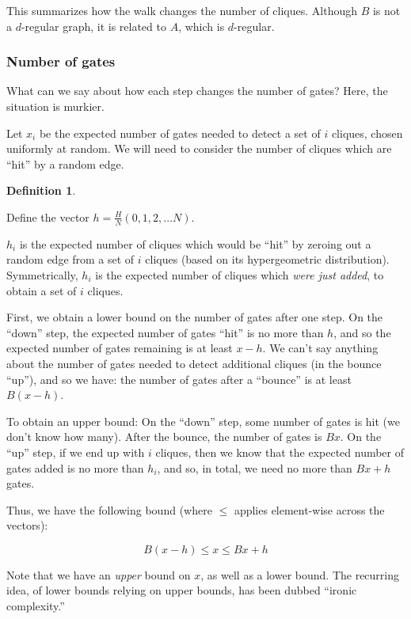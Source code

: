 \documentclass[12pt]{article}
\theoremstyle{definition}
\newtheorem{defn}{Definition}[section]
\begin{document}
This summarizes how the walk changes the number of cliques.
Although $B$ is not a $d$-regular graph, it is related to $A$, which is $d$-regular.

\subsubsection{Number of gates}

What can we say about how each step changes the number of gates? Here, the situation is murkier.

Let $x_i$ be the expected number of gates needed to detect a set of $i$ cliques, chosen
uniformly at random. We will need to consider the number of cliques which are ``hit'' by
a random edge.

\begin{defn} \label{defn:sequenceVector}

Define the vector $h = \frac{H}{N}(0, 1, 2, ... N)$.

$h_i$ is the expected number of cliques which would be ``hit'' by zeroing out a random edge
from a set of $i$ cliques (based on its hypergeometric distribution).
Symmetrically, $h_i$ is the expected number of cliques which {\em were just added}, to obtain a
set of $i$ cliques.

\end{defn}

First, we obtain a lower bound on the number of gates after one step.
On the ``down'' step, the expected number of gates ``hit'' is no more than $h$,
and so the expected number of gates remaining is at least $x - h$.
We can't say anything about the number of gates needed to detect additional cliques (in the bounce ``up''), and so we have:
the number of gates after a ``bounce'' is at least $B(x-h)$.

To obtain an upper bound: On the ``down'' step, some number of gates is hit (we don't know how many).
After the bounce, the number of gates is $Bx$.
On the ``up'' step,
if we end up with $i$ cliques, then we know that the expected number of gates added is no more than $h_i$,
and so, in total, we need no more than $Bx+h$ gates.

Thus, we have the following bound (where $\le$ applies element-wise across the vectors):

\begin{equation}
\label{eq:stepBound}
B(x - h) \le x \le Bx + h
\end{equation}

Note that we have an {\em upper} bound on $x$, as well
as a lower bound.
The recurring idea, of lower bounds relying on upper bounds,
has been dubbed ``ironic complexity.''
\cite{aaronson_pnp}
\end{document}
